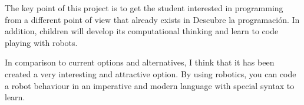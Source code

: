


The key point of this project is to get the student interested in programming from a different point of view that already exists in Descubre la programación. In addition, children will develop its computational thinking and learn to code playing with robots.

In comparison to current options and alternatives, I think that it has been created a very interesting and attractive option. By using robotics, you can code a robot behaviour in an imperative and modern language with special syntax to learn.